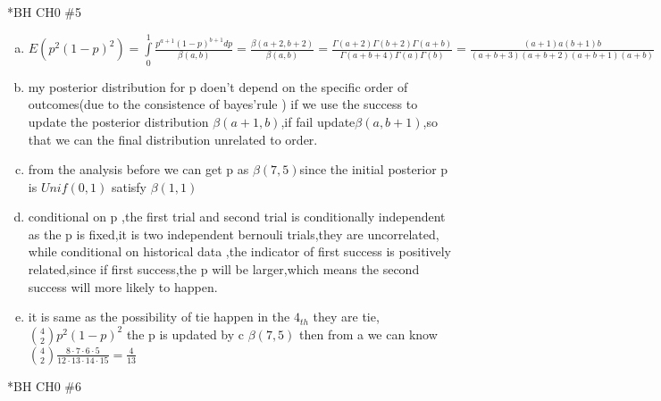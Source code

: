 \documentclass{article}
\begin{document}
\begin{homeworkProblem}*{BH CH0 \#5}
	\begin{enumerate}[(a)]
\item 		$E(p^{2}(1-p)^{2})=\int \limits_{0}^{1}\frac{p^{a+1}(1-p)^{b+1}dp}{\beta(a,b)}=\frac{\beta(a+2,b+2)}{\beta(a,b)}=\frac{\Gamma(a+2)\Gamma(b+2)\Gamma(a+b)}{\Gamma(a+b+4)\Gamma(a)\Gamma(b)}=\frac{(a+1)a(b+1)b}{(a+b+3)(a+b+2)(a+b+1)(a+b)}$
\item my posterior distribution for p doen't depend on the specific order of outcomes(due to the consistence of bayes'rule ) if we use the success to update the posterior distribution $\beta(a+1,b)$,if fail update$\beta(a,b+1)$,so that we can the final distribution unrelated to order.
\item from the analysis before we can get p as $\beta(7,5)$since the initial posterior p is $Unif(0,1)$ satisfy $\beta(1,1)$
\item conditional on p ,the first trial and second trial is conditionally  independent as the p is fixed,it is two independent bernouli trials,they are uncorrelated, while conditional on historical data ,the indicator of first success is positively related,since if first success,the p will be larger,which means the second success will more likely to happen.
\item it is same as the possibility of tie happen in the $4_{th}$ they are tie,$\binom{4}{2}p^{2}(1-p)^{2}$ the p is updated by c $\beta(7,5)$ then from a we can know $\binom{4}{2}\frac{8\cdot 7\cdot 6\cdot 5}{12 \cdot 13\cdot 14\cdot 15}=\frac{4}{13}$
\end{enumerate}
\end{homeworkProblem}

\begin{homeworkProblem}*{BH CH0 \#6}

\end{homeworkProblem}
\end{document}
